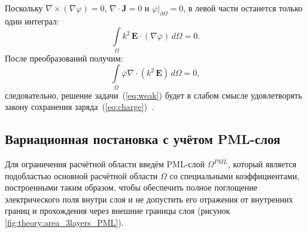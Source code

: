 \documentclass[a4paper,14pt]{article}
\begin{document}
Поскольку $\nabla \times (\nabla \varphi) = 0$, $\nabla \cdot \mathbf{J} = 0$ и $\left. \varphi \right | _{\partial \Omega} = 0$, в левой части останется только один интеграл:
\begin{equation*}
	\int\limits_\Omega k^{2}\, \mathbf{E} \cdot (\nabla \overline{\varphi}) \,d\Omega = 0 .
\end{equation*}
После преобразований получим:
\begin{equation*}
	\int\limits_\Omega \overline{\varphi} \nabla \cdot ( k^{2}\, \mathbf{E} ) \,d\Omega = 0 ,
\end{equation*}
следовательно, решение задачи~(\ref{eq:weak}) будет в слабом смысле удовлетворять закону сохранения заряда~(\ref{eq:charge})~\citep{epov}.


\subsection{Вариационная постановка с учётом PML-слоя}
Для ограничения расчётной области введём PML-слой ${\Omega^{PML}}$, который является подобластью основной расчётной области $\Omega$ со специальными коэффициентами, построенными таким образом, чтобы обеспечить полное поглощение электрического поля внутри слоя и не допустить его отражения от внутренних границ и прохождения через внешние границы слоя (рисунок \ref{fig:theory:area_3layers_PML}).
\end{document}
